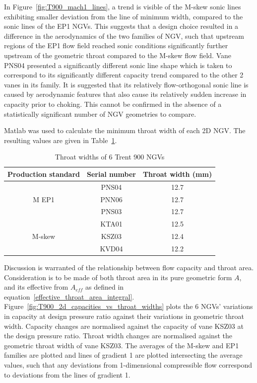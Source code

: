 \documentclass[a4paper, 11pt, oneside]{report}
\begin{document}
In Figure~\ref{fig:T900_mach1_lines}, a trend is visible of the M-skew sonic lines exhibiting smaller deviation from the line of minimum width, compared to the sonic lines of the EP1 NGVs. This suggests that a design choice resulted in a difference in the aerodynamics of the two families of NGV, such that upstream regions of the EP1 flow field reached sonic conditions significantly further upstream of the geometric throat compared to the M-skew flow field. Vane PNS04 presented a significantly different sonic line shape which is taken to correspond to its significantly different capacity trend compared to the other 2 vanes in its family. It is suggested that its relatively flow-orthogonal sonic line is caused by aerodynamic features that also cause its relatively sudden increase in capacity prior to choking. This cannot be confirmed in the absence of a statistically significant number of NGV geometries to compare.

Matlab was used to calculate the minimum throat width of each 2D NGV. The resulting values are given in Table~\ref{T900_throat_widths}.

\begin{table}[H]
\caption{Throat widths of 6 Trent 900 NGVs}
\label{T900_throat_widths}
\begin{center}
\begin{tabular}{|c|c|c|}
\hline
Production standard & Serial number & Throat width (mm)\\
\hline
\multirow{3}{*}{M EP1} & PNS04 & 12.7\\
 & PNN06 & 12.7\\
 & PNS03 & 12.7\\
\hline
\multirow{3}{*}{M-skew} & KTA01 & 12.5\\
 & KSZ03 & 12.4\\
 & KVD04 & 12.2\\
\hline
\end{tabular}
\end{center}
\end{table}

Discussion is warranted of the relationship between flow capacity and throat area. Consideration is to be made of both throat area in its pure geometric form $A$, and its effective from $A_{eff}$ as defined in equation~\ref{effective_throat_area_integral}. Figure~\ref{fig:T900_2d_capacities_vs_throat_widths} plots the 6 NGVs' variations in capacity at design pressure ratio against their variations in geometric throat width. Capacity changes are normalised against the capacity of vane KSZ03 at the design pressure ratio. Throat width changes are normalised against the geometric throat width of vane KSZ03. The averages of the M-skew and EP1 families are plotted and lines of gradient 1 are plotted intersecting the average values, such that any deviations from 1-dimensional compressible flow correspond to deviations from the lines of gradient 1.
\end{document}
